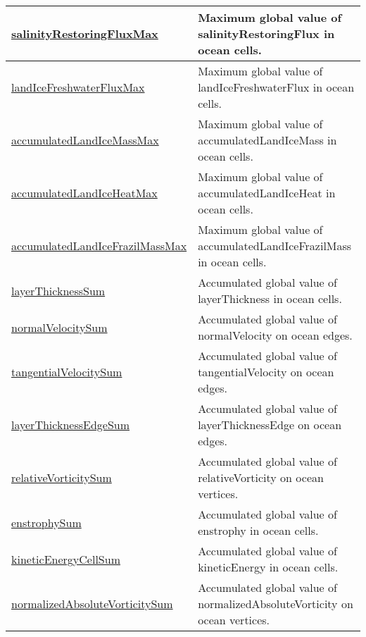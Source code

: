 {\begin{center}
\begin{longtable}{| p{2.0in} | p{4.0in} |}
    \hline
    \hyperref[subsec:var_sec_globalStatsAM_salinityRestoringFluxMax]{salinityRestoringFluxMax} & Maximum global value of salinityRestoringFlux in ocean cells. \\
    \hline
    \hyperref[subsec:var_sec_globalStatsAM_landIceFreshwaterFluxMax]{landIceFreshwaterFluxMax} & Maximum global value of landIceFreshwaterFlux in ocean cells. \\
    \hline
    \hyperref[subsec:var_sec_globalStatsAM_accumulatedLandIceMassMax]{accumulatedLandIceMassMax} & Maximum global value of accumulatedLandIceMass in ocean cells. \\
    \hline
    \hyperref[subsec:var_sec_globalStatsAM_accumulatedLandIceHeatMax]{accumulatedLandIceHeatMax} & Maximum global value of accumulatedLandIceHeat in ocean cells. \\
    \hline
    \hyperref[subsec:var_sec_globalStatsAM_accumulatedLandIceFrazilMassMax]{accumulatedLandIceFrazilMass\-Max} & Maximum global value of accumulatedLandIceFrazilMass in ocean cells. \\
    \hline
    \hyperref[subsec:var_sec_globalStatsAM_layerThicknessSum]{layerThicknessSum} & Accumulated global value of layerThickness in ocean cells. \\
    \hline
    \hyperref[subsec:var_sec_globalStatsAM_normalVelocitySum]{normalVelocitySum} & Accumulated global value of normalVelocity on ocean edges. \\
    \hline
    \hyperref[subsec:var_sec_globalStatsAM_tangentialVelocitySum]{tangentialVelocitySum} & Accumulated global value of tangentialVelocity on ocean edges. \\
    \hline
    \hyperref[subsec:var_sec_globalStatsAM_layerThicknessEdgeSum]{layerThicknessEdgeSum} & Accumulated global value of layerThicknessEdge on ocean edges. \\
    \hline
    \hyperref[subsec:var_sec_globalStatsAM_relativeVorticitySum]{relativeVorticitySum} & Accumulated global value of relativeVorticity on ocean vertices. \\
    \hline
    \hyperref[subsec:var_sec_globalStatsAM_enstrophySum]{enstrophySum} & Accumulated global value of enstrophy in ocean cells. \\
    \hline
    \hyperref[subsec:var_sec_globalStatsAM_kineticEnergyCellSum]{kineticEnergyCellSum} & Accumulated global value of kineticEnergy in ocean cells. \\
    \hline
    \hyperref[subsec:var_sec_globalStatsAM_normalizedAbsoluteVorticitySum]{normalizedAbsoluteVorticitySum} & Accumulated global value of normalizedAbsoluteVorticity on ocean vertices. \\

\end{longtable}
\end{center}}
